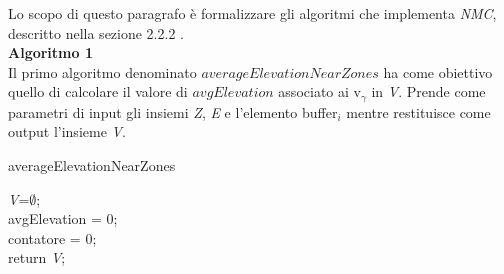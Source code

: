 Lo scopo di questo paragrafo è formalizzare gli algoritmi che implementa \textit{NMC}, descritto nella sezione 2.2.2 .\\ 
\newline
\newline
\textbf{Algoritmo 1}\\
\newline
Il primo algoritmo denominato $averageElevationNearZones$ ha come obiettivo quello di calcolare il valore di $avgElevation$ associato ai v$_\gamma$ in \textit{V}. Prende come parametri di input gli insiemi \textit{Z}, \textit{E} e l'elemento buffer$_i$ mentre restituisce come output l'insieme \textit{V}.\\

\begin{algorithm}[H]
	

	\IncMargin{1em}
	\caption{averageElevationNearZones}
	\label{alg:one}
	\BlankLine
	
	\SetAlgoNoLine
	\textit{V}=$\emptyset$; \\
    avgElevation = $0$; \\
    contatore = $0$; \\
    
	return \textit{V}; 
	

\end{algorithm}

